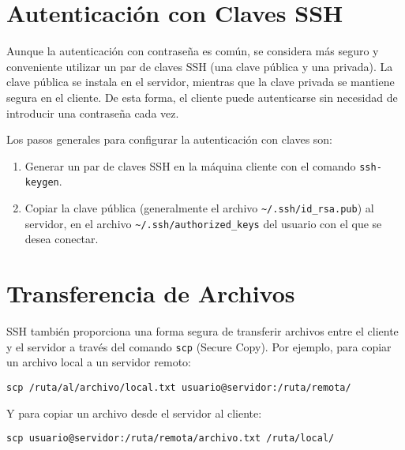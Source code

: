 \section{Autenticación con Claves SSH}

Aunque la autenticación con contraseña es común, se considera más seguro y conveniente utilizar un par de claves SSH (una clave pública y una privada). La clave pública se instala en el servidor, mientras que la clave privada se mantiene segura en el cliente. De esta forma, el cliente puede autenticarse sin necesidad de introducir una contraseña cada vez.

Los pasos generales para configurar la autenticación con claves son:
\begin{enumerate}
    \item Generar un par de claves SSH en la máquina cliente con el comando \texttt{ssh-keygen}.
    \item Copiar la clave pública (generalmente el archivo \texttt{\textasciitilde{}/.ssh/id\_rsa.pub}) al servidor, en el archivo \texttt{\textasciitilde{}/.ssh/authorized\_keys} del usuario con el que se desea conectar.
\end{enumerate}

\section{Transferencia de Archivos}

SSH también proporciona una forma segura de transferir archivos entre el cliente y el servidor a través del comando \texttt{scp} (Secure Copy). Por ejemplo, para copiar un archivo local a un servidor remoto:

\begin{verbatim}
scp /ruta/al/archivo/local.txt usuario@servidor:/ruta/remota/
\end{verbatim}

Y para copiar un archivo desde el servidor al cliente:

\begin{verbatim}
scp usuario@servidor:/ruta/remota/archivo.txt /ruta/local/
\end{verbatim}